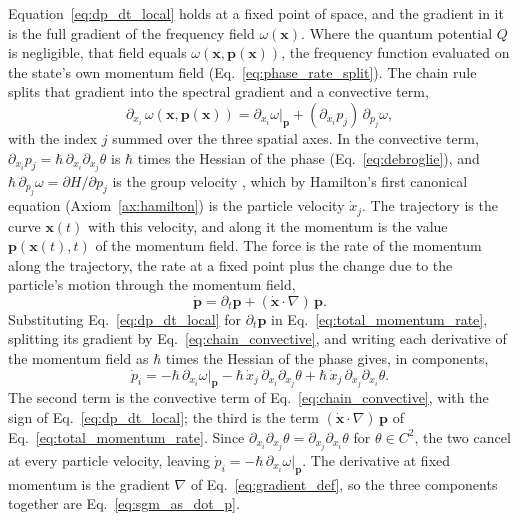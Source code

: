 \documentclass[aps,prd,onecolumn,tightenlines,nofootinbib,notitlepage,11pt,floatfix]{revtex4-2}
\theoremstyle{indentedtheorem}
\begin{document}
Equation~\eqref{eq:dp_dt_local} holds at a fixed point of space, and the gradient in it is the full gradient of the frequency field $\omega(\mathbf{x})$. Where the quantum potential $Q$ is negligible, that field equals $\omega(\mathbf{x},\mathbf{p}(\mathbf{x}))$, the frequency function evaluated on the state's own momentum field (Eq.~\eqref{eq:phase_rate_split}). The chain rule splits that gradient into the spectral gradient and a convective term,
\begin{equation}
    \partial_{x_i}\,\omega(\mathbf{x},\mathbf{p}(\mathbf{x})) = \partial_{x_i}\omega\big|_{\mathbf{p}} + (\partial_{x_i}p_j)\,\partial_{p_j}\omega ,
    \label{eq:chain_convective}
\end{equation}
with the index $j$ summed over the three spatial axes. In the convective term, $\partial_{x_i}p_j=\hbar\,\partial_{x_i}\partial_{x_j}\theta$ is $\hbar$ times the Hessian of the phase (Eq.~\eqref{eq:debroglie}), and $\hbar\,\partial_{p_j}\omega=\partial H/\partial p_j$ is the group velocity \citep{deBroglie1925Thesis}, which by Hamilton's first canonical equation (Axiom~\ref{ax:hamilton}) is the particle velocity $\dot{x}_j$. The trajectory is the curve $\mathbf{x}(t)$ with this velocity, and along it the momentum is the value $\mathbf{p}(\mathbf{x}(t),t)$ of the momentum field. The force is the rate of the momentum along the trajectory, the rate at a fixed point plus the change due to the particle's motion through the momentum field,
\begin{equation}
    \dot{\mathbf{p}} = \partial_t\mathbf{p} + (\dot{\mathbf{x}}\cdot\nabla)\,\mathbf{p} .
    \label{eq:total_momentum_rate}
\end{equation}
Substituting Eq.~\eqref{eq:dp_dt_local} for $\partial_t\mathbf{p}$ in Eq.~\eqref{eq:total_momentum_rate}, splitting its gradient by Eq.~\eqref{eq:chain_convective}, and writing each derivative of the momentum field as $\hbar$ times the Hessian of the phase gives, in components,
\begin{equation}
    \dot{p}_i = -\hbar\,\partial_{x_i}\omega\big|_{\mathbf{p}} - \hbar\,\dot{x}_j\,\partial_{x_i}\partial_{x_j}\theta + \hbar\,\dot{x}_j\,\partial_{x_j}\partial_{x_i}\theta .
    \label{eq:route2_components}
\end{equation}
The second term is the convective term of Eq.~\eqref{eq:chain_convective}, with the sign of Eq.~\eqref{eq:dp_dt_local}; the third is the term $(\dot{\mathbf{x}}\cdot\nabla)\,\mathbf{p}$ of Eq.~\eqref{eq:total_momentum_rate}. Since $\partial_{x_i}\partial_{x_j}\theta=\partial_{x_j}\partial_{x_i}\theta$ for $\theta\in C^2$, the two cancel at every particle velocity, leaving $\dot{p}_i=-\hbar\,\partial_{x_i}\omega|_{\mathbf{p}}$. The derivative at fixed momentum is the gradient $\nabla$ of Eq.~\eqref{eq:gradient_def}, so the three components together are Eq.~\eqref{eq:sgm_as_dot_p}.
\end{document}
